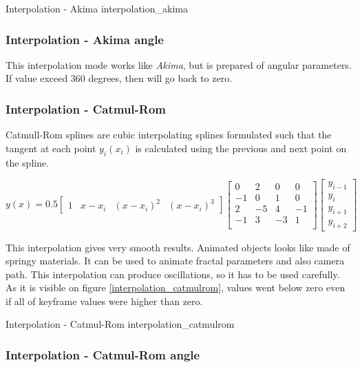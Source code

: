 {Interpolation - Akima}
{interpolation_akima}

\subsubsection{Interpolation - Akima angle}\label{interpolation-akima-angle}

This interpolation mode works like \emph{Akima}, but is prepared of angular
parameters. If value exceed 360 degrees, then will go back to zero.

\subsubsection{Interpolation - Catmul-Rom}\label{interpolation-catmul-rom}

Catmull-Rom splines are cubic interpolating splines formulated such that the
tangent at each point $ y_i(x_i) $ is calculated using the previous and next
point on the spline.

\[ y(x) = 0.5 \begin{bmatrix} 1 & x-x_i & (x-x_i)^2 & (x-x_i)^3\end{bmatrix}
\begin{bmatrix} 0 & 2 & 0 & 0 \\ -1 & 0 & 1 & 0 \\ 2 & -5 & 4 & -1 \\ -1 & 3 &
-3 & 1 \\ \end{bmatrix} \begin{bmatrix} y_{i-1} \\ y_i \\ y_{i+1} \\ y_{i+2}
\end{bmatrix} \]

This interpolation gives very smooth results. Animated objects looks like made
of springy materials. It can be used to animate fractal parameters and also
camera path. This interpolation can produce oscillations, so it has to be used
carefully. As it is visible on figure \ref{interpolation_catmulrom}, 
values went below zero even if all of keyframe values were higher than zero.

{Interpolation - Catmul-Rom}
{interpolation_catmulrom}

\subsubsection{Interpolation - Catmul-Rom
	angle}\label{interpolation-catmul-rom-angle}

